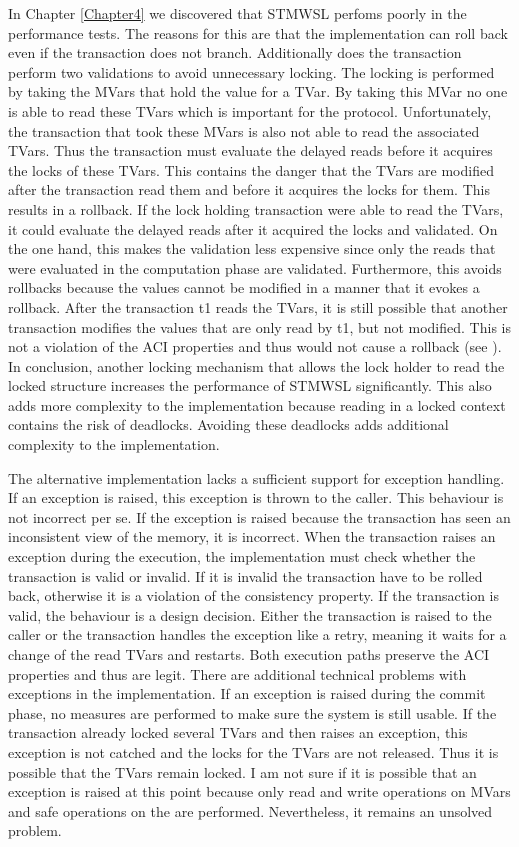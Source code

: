 In Chapter \ref{Chapter4} we discovered that STMWSL perfoms poorly in the performance tests. The reasons for this are 
that the implementation can roll back even if the transaction does not branch. Additionally does the 
transaction perform two validations to avoid unnecessary locking. The locking is performed by taking
the MVars that hold the value for a TVar. By taking this MVar no one is able to read these TVars which 
is important for the protocol. Unfortunately, the transaction that took these MVars is also not able to read 
the associated TVars. Thus the transaction must evaluate the delayed reads before it acquires the locks of these 
TVars. This contains the danger that the TVars are modified after the transaction read them and before
it acquires the locks for them. This results in a rollback. If the lock holding transaction were able 
to read the TVars, it could evaluate the delayed reads after it acquired the locks and validated. On the
one hand, this makes the validation less expensive since only the reads that were evaluated in the 
computation phase are validated. Furthermore, this avoids rollbacks because the values cannot 
be modified in a manner that it evokes a rollback. After the transaction t1 reads the TVars, it is 
still possible that another transaction modifies the values that are only read by t1, but not modified.
This is not a violation of the ACI properties and thus would not cause a rollback (see \parencite{lockfreedom}).
In conclusion, another locking mechanism that allows the lock holder to read the locked structure
increases the performance of STMWSL significantly. This also adds more complexity to the implementation
because reading in a locked context contains the risk of deadlocks. Avoiding these deadlocks adds 
additional complexity to the implementation.

The alternative implementation lacks a sufficient support for exception handling. If an exception is
raised, this exception is thrown to the caller. This behaviour is not incorrect per se. If the 
exception is raised because the transaction has seen an inconsistent view of the memory, it is 
incorrect. When the transaction raises an exception during the execution, the implementation must 
check whether the transaction is valid or invalid. If it is invalid the transaction have to be rolled 
back, otherwise it is a violation of the consistency property. If the transaction is valid, the 
behaviour is a design decision. Either the transaction is raised to the caller or the transaction 
handles the exception like a retry, meaning it waits for a change of the read TVars and restarts.
Both execution paths preserve the ACI properties and thus are legit. There are additional 
technical problems with exceptions in the implementation. If an exception is raised during the 
commit phase, no measures are performed to make sure the system 
is still usable. If the transaction already locked several TVars and then raises an exception, this 
exception is not catched and the locks for the TVars are not released. Thus it is possible that 
the TVars remain locked. I am not sure if it is possible that an exception is raised at this point
because only read and write operations on MVars and safe operations on the  are performed.
Nevertheless, it remains an unsolved problem.

